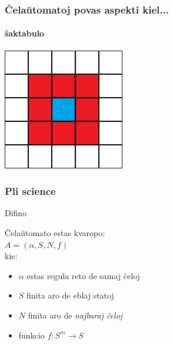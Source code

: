 \documentclass{beamer}
\begin{document}
  \begin{frame}
  	\frametitle{Ĉelaŭtomatoj povas aspekti kiel...}
  	\framesubtitle{ŝaktabulo}
  	\begin{center}
  	\includegraphics[scale=1]{CA-Moore}
  	\end{center}
  \end{frame}

  \begin{frame}
  	\frametitle{Pli science}
  	\begin{block}{Difino}
  	
  	Ĉelaŭtomato estas kvaropo: \\  		
  	$A = \left( \alpha, S, N, f \right)$ \\
  	kie:  		\\
  	\begin{itemize}
		\item<1-> $ \alpha $ estas regula reto de samaj ĉeloj
		\item<2-> $ S $ finita aro de eblaj statoj
		\item<3-> $ N $ finita aro de \textit{najbaraj ĉeloj}
		\item<4-> funkcio $ f: S^{m} \rightarrow S $
  	\end{itemize}
   	\end{block}
  \end{frame}
 
\end{document}
